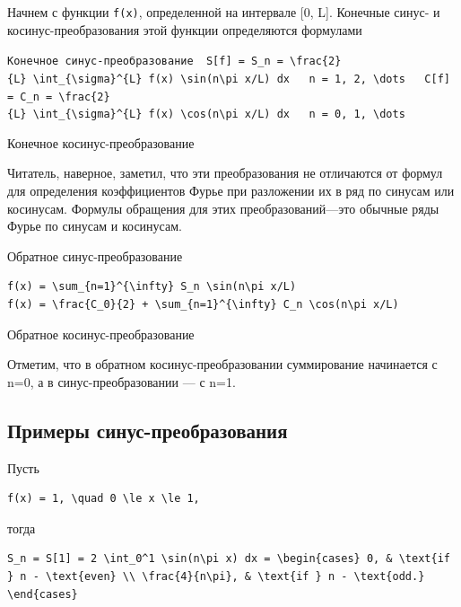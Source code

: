 \documentclass[
  ukrainian,
]{article}
\begin{document}
Начнем с функции \texttt{f(x)}, определенной на интервале {[}0, L{]}.
Конечные синус- и косинус-преобразования этой функции определяются
формулами

\texttt{Конечное\ синус-преобразование\ \ \textquotesingle{}S{[}f{]}\ =\ S\_n\ =\ \textbackslash{}frac\{2\}\{L\}\ \textbackslash{}int\_\{\textbackslash{}sigma\}\^{}\{L\}\ f(x)\ \textbackslash{}sin(n\textbackslash{}pi\ x/L)\ dx\textquotesingle{}\ \ \ \textquotesingle{}n\ =\ 1,\ 2,\ \textbackslash{}dots\textquotesingle{}\ \ \ \textquotesingle{}C{[}f{]}\ =\ C\_n\ =\ \textbackslash{}frac\{2\}\{L\}\ \textbackslash{}int\_\{\textbackslash{}sigma\}\^{}\{L\}\ f(x)\ \textbackslash{}cos(n\textbackslash{}pi\ x/L)\ dx\textquotesingle{}\ \ \ \textquotesingle{}n\ =\ 0,\ 1,\ \textbackslash{}dots\textquotesingle{}}

Конечное косинус-преобразование

Читатель, наверное, заметил, что эти преобразования не отличаются от
формул для определения коэффициентов Фурье при разложении их в ряд по
синусам или косинусам. Формулы обращения для этих преобразований---это
обычные ряды Фурье по синусам и косинусам.

Обратное синус-преобразование

\begin{verbatim}
f(x) = \sum_{n=1}^{\infty} S_n \sin(n\pi x/L)
f(x) = \frac{C_0}{2} + \sum_{n=1}^{\infty} C_n \cos(n\pi x/L)
\end{verbatim}

Обратное косинус-преобразование

Отметим, что в обратном косинус-преобразовании суммирование начинается с
n=0, а в синус-преобразовании --- с n=1.

\subsection{Примеры
синус-преобразования}\label{ux43fux440ux438ux43cux435ux440ux44b-ux441ux438ux43dux443ux441-ux43fux440ux435ux43eux431ux440ux430ux437ux43eux432ux430ux43dux438ux44f}

Пусть

\begin{verbatim}
f(x) = 1, \quad 0 \le x \le 1,
\end{verbatim}

тогда

\begin{verbatim}
S_n = S[1] = 2 \int_0^1 \sin(n\pi x) dx = \begin{cases} 0, & \text{if } n - \text{even} \\ \frac{4}{n\pi}, & \text{if } n - \text{odd.} \end{cases}
\end{verbatim}
\end{document}
